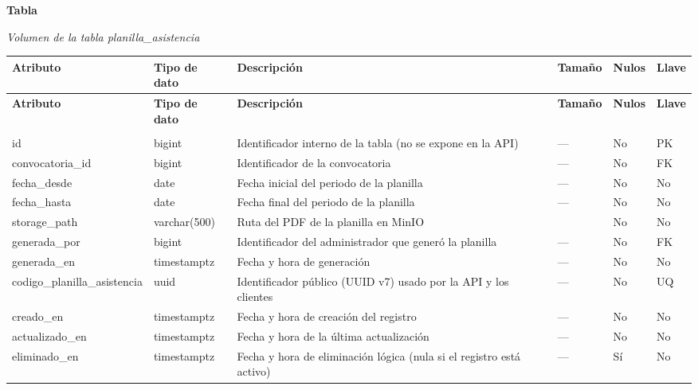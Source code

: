 \label{tab:volumen_planilla_asistencia}
\noindent\textbf{Tabla~\thetable}\par\nopagebreak
\noindent\textit{Volumen de la tabla planilla\_\allowbreak{}asistencia}\par\nopagebreak
\begingroup\small\linespread{1}\selectfont\setlength{\tabcolsep}{4pt}
\begin{longtable}{>{\raggedright\arraybackslash}p{3.4cm} >{\raggedright\arraybackslash}p{2.5cm} >{\raggedright\arraybackslash}p{4.8cm} >{\centering\arraybackslash}p{1.6cm}>{\centering\arraybackslash}p{1.1cm} >{\centering\arraybackslash}p{1.3cm}}
\toprule
\textbf{Atributo} & \textbf{Tipo de dato} & \textbf{Descripción} & \textbf{Tamaño} & \textbf{Nulos} & \textbf{Llave} \\
\midrule
\endfirsthead
\toprule
\textbf{Atributo} & \textbf{Tipo de dato} & \textbf{Descripción} & \textbf{Tamaño} & \textbf{Nulos} & \textbf{Llave} \\
\midrule
\endhead
\endfoot
\bottomrule
\multicolumn{6}{l}{\textit{Nota.} Elaboración propia.} \\
\endlastfoot
id & bigint & Identificador interno de la tabla (no se expone en la API) & — & No & PK \\
convocatoria\_\allowbreak{}id & bigint & Identificador de la convocatoria & — & No & FK \\
fecha\_\allowbreak{}desde & date & Fecha inicial del periodo de la planilla & — & No & No \\
fecha\_\allowbreak{}hasta & date & Fecha final del periodo de la planilla & — & No & No \\
storage\_\allowbreak{}path & varchar(500) & Ruta del PDF de la planilla en MinIO & 500 & No & No \\
generada\_\allowbreak{}por & bigint & Identificador del administrador que generó la planilla & — & No & FK \\
generada\_\allowbreak{}en & timestamptz & Fecha y hora de generación & — & No & No \\
codigo\_\allowbreak{}planilla\_\allowbreak{}asistencia & uuid & Identificador público (UUID v7) usado por la API y los clientes & — & No & UQ \\
creado\_\allowbreak{}en & timestamptz & Fecha y hora de creación del registro & — & No & No \\
actualizado\_\allowbreak{}en & timestamptz & Fecha y hora de la última actualización & — & No & No \\
eliminado\_\allowbreak{}en & timestamptz & Fecha y hora de eliminación lógica (nula si el registro está activo) & — & Sí & No \\
\end{longtable}
\endgroup
\addtocounter{table}{-1}

